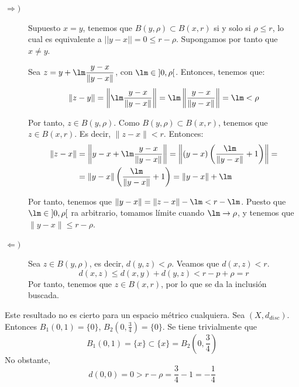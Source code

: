 \begin{ejercicio}
\begin{enumerate}
        \begin{description}
            \item[$\Longrightarrow)$] Supuesto $x=y$, tenemos que $B(y,\rho)\subset B(x,r)$ si y solo si $\rho\leq r$, lo cual es equivalente a $||y-x||=0\leq r-\rho$. Supongamos por tanto que $x\neq y$.            
            
            Sea $z=y+\lm \dfrac{y-x}{\|y-x\|}$, con $\lm\in \left]0,\rho\right[$. Entonces, tenemos que:
            \begin{equation*}
                \|z-y\| = \left\|\lm \dfrac{y-x}{\|y-x\|}\right\| = \lm \left\|\dfrac{y-x}{\|y-x\|}\right\| = \lm < \rho
            \end{equation*}

            Por tanto, $z\in B(y,\rho)$. Como $B(y,\rho)\subset B(x,r)$, tenemos que $z\in B(x,r)$. Es decir, $\|z-x\|<r$. Entonces:
            \begin{align*}
                \|z-x\| &= \left\|y-x+\lm \dfrac{y-x}{\|y-x\|}\right\| = \left\|(y-x)\left(\frac{\lm}{\|y-x\|}+1\right)\right\| =\\&= 
                \|y-x\|\left(\frac{\lm}{\|y-x\|}+1\right) = \|y-x\|+\lm
            \end{align*}

            Por tanto, tenemos que $\|y-x\|=\|z-x\|-\lm<r-\lm$. Puesto que $\lm\in \left]0,\rho\right[$ ra arbitrario, tomamos límite cuando $\lm\to \rho$, y tenemos que $\|y-x\|\leq r-\rho$.

            \item[$\Longleftarrow)$] Sea $z\in B(y,\rho)$, es decir, $d(y,z)<\rho$. Veamos que $d(x,z)<r$.
            \begin{equation*}
                d(x,z)\leq d(x,y)+d(y,z) < r-p + \rho = r
            \end{equation*}
            Por tanto, tenemos que $z\in B(x,r)$, por lo que se da la inclusión buscada.
        \end{description}

        Este resultado no es cierto para un espacio métrico cualquiera. Sea $(X,d_{disc})$. Entonces $B_1\left(0,1\right)=\{0\}$, $B_2\left(0, \frac{3}{4}\right)=\{0\}$. Se tiene trivialmente que $$B_1(0,1)=\{x\}\subset\{x\}=B_2\left(0, \frac{3}{4}\right)$$
        No obstante,
        $$d(0,0)=0>r-\rho = \frac{3}{4}-1 = -\frac{1}{4}$$
    \end{enumerate}
\end{ejercicio}


